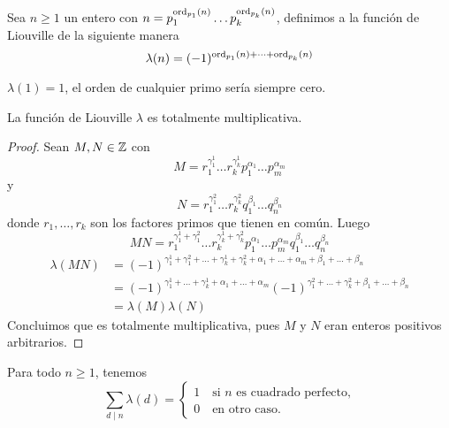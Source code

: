 \documentclass[main.tex]{subfiles}
\begin{document}
\begin{defn}
Sea $n \geq 1$ un entero con $n = p_1^{\operatorname{ord}_{p_1}(n)}\dots p_k^{\operatorname{ord}_{p_k}(n)}$, definimos a la funci\'on de Liouville de la siguiente manera
$$\lambda(n) = (-1)^{\operatorname{ord}_{p_1}(n) + \dots +\operatorname{ord}_{p_k}(n)}$$
\end{defn}
\begin{remark}
$\lambda(1) = 1$, el orden de cualquier primo ser\'ia siempre cero.
\end{remark}
\begin{theorem}
La funci\'on de Liouville $\lambda$ es totalmente multiplicativa.
\end{theorem}
\begin{proof}
Sean $M, N \in \mathbb Z$ con $$M = r_1^{\gamma_1^1}\dots r_k^{\gamma_k^1}p_1^{\alpha_1}\dots p_m^{\alpha_m}$$
y
$$N = r_1^{\gamma_1^2}\dots r_k^{\gamma_k^2}q_1^{\beta_1}\dots q_n^{\beta_n}$$ donde $r_1, \dots, r_k$ son los factores primos que tienen en com\'un. Luego
$$MN = r_1^{\gamma_1^1 + \gamma_1^2} \dots r_k^{\gamma_k^1 + \gamma_k^2}p_1^{\alpha_1}\dots p_m^{\alpha_m}q_1^{\beta_1}\dots q_n^{\beta_n}$$
\begin{align*}
    \lambda(MN) &= (-1)^{\gamma_1^1 + \gamma_1^2 + \dots + \gamma_k^1 + \gamma_k^2 + \alpha_1 + \dots + \alpha_m + \beta_1 + \dots + \beta_n}\\
    &= (-1)^{\gamma_1^1 + \dots + \gamma_k^1 + \alpha_1 + \dots + \alpha_m}(-1)^{\gamma_1^2 + \dots + \gamma_k^2 + \beta_1 + \dots + \beta_n}\\
    &= \lambda(M)\lambda(N)
\end{align*}
Concluimos que es totalmente multiplicativa, pues $M$ y $N$ eran enteros positivos arbitrarios.
\end{proof}
\begin{theorem}
Para todo $n \geq 1$, tenemos
\[
\sum_{d \mid n} \lambda(d) =
\begin{cases}
1 \quad \text{si } n \text{ es cuadrado perfecto,}\\
0 \quad \text{en otro caso.}
\end{cases}
\]
\end{theorem}
\end{document}
